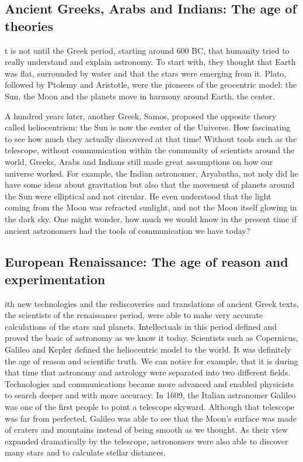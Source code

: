 \subsection{Ancient Greeks, Arabs and Indians: The age of theories}
t is not until the Greek period, starting around 600 BC, that humanity tried to really understand and explain astronomy. 
To start with, they thought that Earth was flat, surrounded by water and that the stars were emerging from it.
Plato, followed by Ptolemy and Aristotle, were the pioneers of the geocentric model: the Sun, the Moon and the planets move in harmony around Earth, the center.

A hundred years later, another Greek, Samos, proposed the opposite theory called heliocentrism: the Sun is now the center of the Universe.
How fascinating to see how much they actually discovered at that time!  
Without tools such as the telescope, without communication within the community of scientists around the world, Greeks, Arabs and Indians still made great assumptions on how our universe worked. 
For example, the Indian astronomer, Aryabatha, not noly did he have some ideas about gravitation but also that the movement of planets around the Sun were elliptical and not circular.
He even understood that the light coming from the Moon was refracted sunlight, and not the Moon itself glowing in the dark sky.
One might wonder, how much we would know in the present time if ancient astronomers had the tools of communication we have today?
\cite{GreekAstro}
\cite{Aryabatha}

\subsection{European Renaissance: The age of reason and experimentation}
ith new technologies and the rediscoveries and translations of ancient Greek texts, the scientists of the renaissance period, were able to make very accurate calculations of the stars and planets.
Intellectuals in this period defined and proved the basic of astronomy as we know it today.  
Scientists such as Copernicus, Galileo and Kepler defined the heliocentric model to the world. 
It was definitely the age of reason and scientific truth. 
We can notice for example, that it is during that time that astronomy and astrology were separated into two different fields. 
Technologies and communications became more advanced and enabled physicists to search deeper and with more accuracy. 
In 1609, the Italian astronomer Galileo was one of the first people to point a telescope skyward. 
Although that telescope was far from perfected, Galileo was able to see that the Moon's surface was made of craters and mountains instead of being smooth as we thought.
As their view expanded dramatically by the telescope, astronomers were also able to discover many stars and to calculate stellar distances.
\cite{GalileoTelescope}

